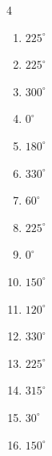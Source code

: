 \begin{multicols}{4}
\begin{enumerate}
  \item $\displaystyle 225^{\circ}$

  \item $\displaystyle 225^{\circ}$

  \item $\displaystyle 300^{\circ}$

  \item $\displaystyle 0^{\circ}$
        \phantom{$\displaystyle =0$}

  \item $\displaystyle 180^{\circ}$
        \phantom{$\displaystyle =\pi$}

  \item $\displaystyle 330^{\circ}$

  \item $\displaystyle 60^{\circ}$

  \item $\displaystyle 225^{\circ}$

  \item $\displaystyle 0^{\circ}$
        \phantom{$\displaystyle =0$}

  \item $\displaystyle 150^{\circ}$

  \item $\displaystyle 120^{\circ}$

  \item $\displaystyle 330^{\circ}$

  \item $\displaystyle 225^{\circ}$

  \item $\displaystyle 315^{\circ}$

  \item $\displaystyle 30^{\circ}$

  \item $\displaystyle 150^{\circ}$


\end{enumerate}
\end{multicols}
